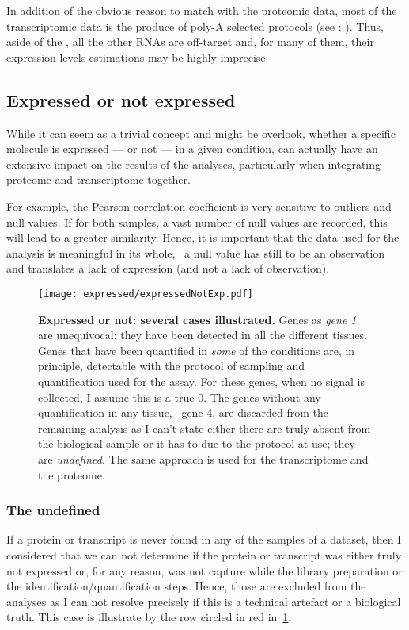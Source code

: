 In addition of the obvious reason to match with the proteomic data,
most of the transcriptomic data is the produce of poly-A selected protocols
(see : ).
Thus, aside of the \mRNAs, all the other \glspl{RNA} are off-target
and, for many of them,
their expression levels estimations may be highly imprecise.


\subsection{Expressed or not expressed}
\label{sec:ExpressedOrNot}

While it can seem as a trivial concept and might be overlook, whether a specific
molecule is expressed --- or not --- in a given condition, can actually have
an extensive impact on the results of the analyses, particularly when integrating
proteome and transcriptome together.

For example, the Pearson correlation coefficient is very
sensitive to outliers and null values. If for both samples, a vast number of
null values are recorded, this will lead to a greater similarity.
Hence, it is important that the data used for the analysis is meaningful in
its whole, \ie\ a null value has still to be an observation and translates
a lack of expression (and not a lack of observation).

\begin{figure}[!htb]
    \texttt{[image: expressed/expressedNotExp.pdf]}\centering
      \caption[Expressed or not: several cases illustrated]
      {\label{fig:DefineExpression}\textbf{Expressed or not: several cases
      illustrated.}\smallbreak{} Genes as \emph{gene 1} are unequivocal: they have been
      detected in all the different tissues. Genes that have been quantified in
      \emph{some} of the conditions are, in principle, detectable with the
      protocol of sampling and quantification used for the assay.
      For these genes, when no signal is collected, I assume this is a true $0$.
      The genes without any quantification
      in any tissue, \eg\ gene 4, are discarded from the remaining analysis as
      I can't state
      either there are truly absent from the biological sample or it has to due
      to the protocol at use; they are \emph{undefined}. The same approach is used
      for the transcriptome and the proteome.}
\end{figure}

\subsubsection{The undefined}%
\label{subsec:ExpressedOrNot-undefined}
If a protein or transcript is never found in any of the samples of a dataset,
then I considered that we can not determine if the protein or transcript was
either truly not expressed or, for any reason, was not capture while the library
preparation or the identification/quantification steps. Hence, those are
excluded from the analyses as I can not resolve precisely if this is a
technical artefact or a biological truth. This case is illustrate by the row
circled in red in~\cref{fig:DefineExpression}.

